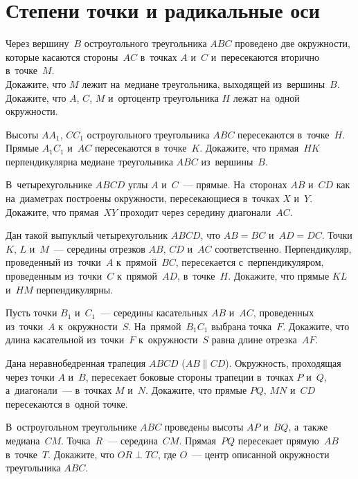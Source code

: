 
\section*{Степени точки и радикальные оси}


\begin{problems}

\item
Через вершину~$B$ остроугольного треугольника $ABC$ проведено две окружности,
которые касаются стороны~$AC$ в~точках $A$ и~$C$ и~пересекаются вторично
в~точке~$M$.
\\
\subproblem
Докажите, что $M$ лежит на~медиане треугольника, выходящей из~вершины~$B$.
\\
\subproblem
Докажите, что $A$, $C$, $M$ и~ортоцентр треугольника $H$ лежат на~одной
окружности.

\item
Высоты $A A_1$, $C C_1$ остроугольного треугольника $ABC$ пересекаются
в~точке~$H$.
Прямые $A_1 C_1$ и~$AC$ пересекаются в~точке~$K$.
Докажите, что прямая~$HK$ перпендикулярна медиане треугольника $ABC$
из~вершины~$B$.

\item
В~четырехугольнике $ABCD$ углы $A$ и~$C$~— прямые.
На~сторонах $AB$ и~$CD$ как на~диаметрах построены окружности, пересекающиеся
в~точках $X$ и~$Y$.
Докажите, что прямая~$XY$ проходит через середину диагонали~$AC$.

\item
Дан такой выпуклый четырехугольник $ABCD$, что $AB = BC$ и~$AD = DC$.
Точки $K$, $L$ и~$M$~— середины отрезков $AB$, $CD$ и~$AC$ соответственно.
Перпендикуляр, проведенный из~точки~$A$ к~прямой~$BC$, пересекается
с~перпендикуляром, проведенным из~точки~$C$ к~прямой~$AD$, в~точке~$H$.
Докажите, что прямые $KL$ и~$HM$ перпендикулярны.

\item
Пусть точки $B_1$ и~$C_1$~— середины касательных $AB$ и~$AC$, проведенных
из~точки~$A$ к~окружности~$S$.
На~прямой~$B_1 C_1$ выбрана точка~$F$.
Докажите, что длина касательной из~точки~$F$ к~окружности~$S$ равна длине
отрезка~$AF$.

\item
Дана неравнобедренная трапеция $ABCD$ ($AB \parallel CD$).
Окружность, проходящая через точки $A$ и~$B$, пересекает боковые стороны
трапеции в~точках $P$ и~$Q$, а~диагонали~— в~точках $M$ и~$N$.
Докажите, что прямые $PQ$, $MN$ и~$CD$ пересекаются в~одной точке.

\item
В~остроугольном треугольнике $ABC$ проведены высоты $AP$ и~$BQ$, а~также
медиана~$CM$.
Точка~$R$~— середина~$CM$.
Прямая~$PQ$ пересекает прямую~$AB$ в~точке~$T$.
Докажите, что $OR \perp TC$, где $O$~— центр описанной окружности
треугольника $ABC$.

\end{problems}

